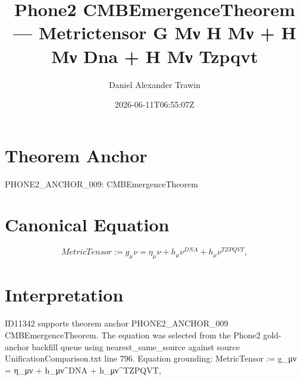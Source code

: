 \documentclass[11pt]{article}
\title{Phone2 CMBEmergenceTheorem — Metrictensor G Μν Η Μν + H Μν Dna + H Μν Tzpqvt}
\author{Daniel Alexander Trawin}
\date{2026-06-11T06:55:07Z}
\begin{document}
\maketitle
\section*{Theorem Anchor}
PHONE2_ANCHOR_009: CMBEmergenceTheorem
\section*{Canonical Equation}
\[
MetricTensor := g_μν = η_μν + h_μν^{DNA} + h_μν^{TZPQVT},
\]
\section*{Interpretation}
ID11342 supports theorem anchor PHONE2_ANCHOR_009 CMBEmergenceTheorem. The equation was selected from the Phone2 gold-anchor backfill queue using nearest_same_source against source UnificationComparison.txt line 796. Equation grounding: MetricTensor := g_μν = η_μν + h_μν^{DNA} + h_μν^{TZPQVT},
\end{document}
